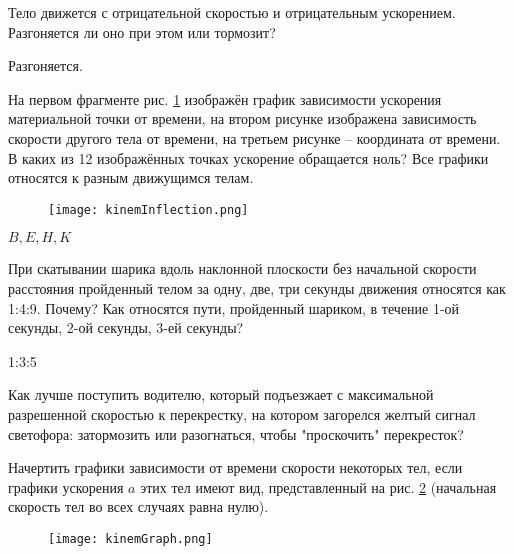 \qualProblems

\begin{ex} %
Тело движется с отрицательной скоростью и отрицательным ускорением. Разгоняется ли оно при этом или тормозит?
\begin{ans}
Разгоняется.
\end{ans}
\end{ex}

\begin{ex} %
На первом фрагменте рис. \ref{kinemInflection} изображён график зависимости ускорения материальной точки от времени, на втором рисунке изображена зависимость скорости другого тела от времени, на третьем рисунке – координата от времени. В каких из 12 изображённых точках ускорение обращается ноль? Все графики относятся к разным движущимся телам.

\begin{figure}[h]
\centering
\texttt{[image: kinemInflection.png]}
\caption{}
\label{kinemInflection}
\end{figure}
\begin{ans}
$B, E, H, K$
\end{ans}
\end{ex}

\begin{ex} %
При скатывании шарика вдоль наклонной плоскости без начальной скорости расстояния пройденный телом за одну, две, три секунды движения относятся как 1:4:9. Почему? Как относятся пути, пройденный шариком, в течение 1-ой секунды, 2-ой секунды, 3-ей секунды?
\begin{ans}
1:3:5
\end{ans}
\end{ex}

\begin{ex} %
Как лучше поступить водителю, который подъезжает с максимальной разрешенной скоростью к перекрестку, на котором загорелся желтый сигнал светофора: затормозить или разогнаться, чтобы "проскочить" перекресток?
\begin{ans}
\end{ans}
\end{ex}


\simpleProblems

\begin{ex} %
Начертить графики зависимости от времени скорости некоторых тел, если графики ускорения $a$ этих тел имеют вид, представленный на рис. \ref{kinemGraph} (начальная скорость тел во всех случаях равна нулю).

\begin{figure}[h]
\centering
\texttt{[image: kinemGraph.png]}
\caption{}
\label{kinemGraph}
\end{figure}
\begin{ans}
\end{ans}
\end{ex}


